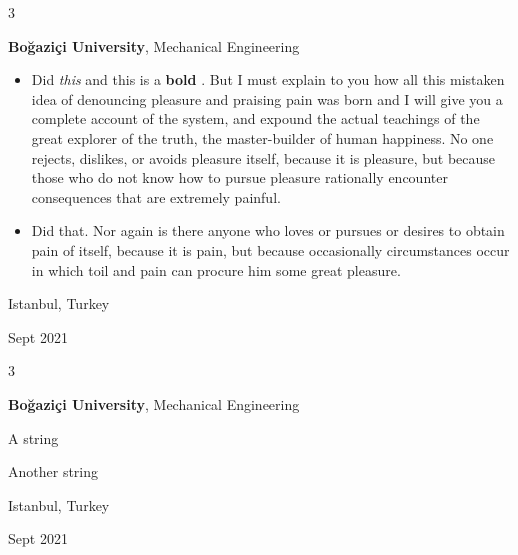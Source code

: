 \documentclass[10pt, letterpaper]{article}
\newenvironment{summary}{
    \begin{description}[
        topsep=0.10 cm,
        parsep=0.10 cm,
        partopsep=0pt,
        itemsep=0pt,
        leftmargin=0.4 cm + 10pt
    ]
}{
    \end{description}
} %
\newenvironment{highlights}{
    \begin{itemize}[
        topsep=0.10 cm,
        parsep=0.10 cm,
        partopsep=0pt,
        itemsep=0pt,
        leftmargin=0.4 cm + 10pt
    ]
}{
    \end{itemize}
} %
\newenvironment{threecolentry}[3][]{
    \onecolentry
    \def\thirdColumn{#3}
    \setcolumnwidth{1 cm, \fill, 4.5 cm}
    \begin{paracol}{3}
    {\raggedright #2} \switchcolumn
}{
    \switchcolumn \raggedleft \thirdColumn
    \end{paracol}
    \endonecolentry
} %
\let\hrefWithoutArrow\href
\renewcommand{\href}[2]{\hrefWithoutArrow{#1}{\ifthenelse{\equal{#2}{}}{ }{#2 }\raisebox{.15ex}{\footnotesize \faExternalLink*}}}
\begin{document}
        \vspace{0.2 cm}

        \begin{threecolentry}{\textbf{}}{
            Istanbul, Turkey

        Sept 2021
        }
            \textbf{Boğaziçi University}, Mechanical Engineering
            \begin{highlights}
                \item Did \textit{this} and this is a \textbf{bold} \href{https://example.com}{link}. But I must explain to you how all this mistaken idea of denouncing pleasure and praising pain was born and I will give you a complete account of the system, and expound the actual teachings of the great explorer of the truth, the master-builder of human happiness. No one rejects, dislikes, or avoids pleasure itself, because it is pleasure, but because those who do not know how to pursue pleasure rationally encounter consequences that are extremely painful.
                \item Did that. Nor again is there anyone who loves or pursues or desires to obtain pain of itself, because it is pain, but because occasionally circumstances occur in which toil and pain can procure him some great pleasure.
            \end{highlights}
        \end{threecolentry}

        \vspace{0.2 cm}

        \begin{threecolentry}{\textbf{}}{
            Istanbul, Turkey

        Sept 2021
        }
            \textbf{Boğaziçi University}, Mechanical Engineering
            \begin{summary}
                \item A string
                \item Another string
            \end{summary}
        \end{threecolentry}

        \vspace{0.2 cm}
\end{document}
